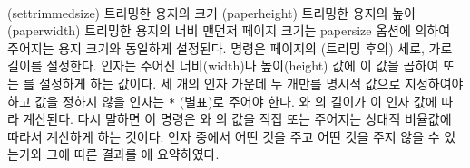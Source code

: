 \begin{syntax}
\cmd{\settrimmedsize} \\
\end{syntax}
\glossary(settrimmedsize)%
  {}%
  {트리밍한 용지의 크기}
\glossary(paperheight)%
  {}%
  {트리밍한 용지의 높이}
\glossary(paperwidth)%
  {}%
  {트리밍한 용지의 너비}
맨먼저 페이지 크기는 papersize 옵션에 의하여 주어지는 용지 크기와 동일하게 설정된다.
\cmd{\settrimmedsize} 명령은 페이지의 (트리밍 후의) 세로, 가로 길이를
설정한다.
 인자는 주어진 너비(width)나 높이(height) 값에 이 값을 곱하여 
또는 를 설정하게 하는 값이다. 세 개의 인자 가운데 두 개만를
명시적 값으로 지정하여야 하고 값을 정하지 않을 인자는 \verb?*? (별표)로
주어야 한다. \lnc{\paperheight}와 \lnc{\paperwidth}의 길이가
이 인자 값에 따라 계산된다. 다시 말하면 이 명령은
\lnc{\paperheight}와 \lnc{\paperwidth}의 값을 직접 또는 주어지는 상대적
비율값에 따라서 계산하게 하는 것이다. 인자 중에서 어떤 것을 주고 어떤 것을
주지 않을 수 있는가와 그에 따른 결과를 에 요약하였다.

